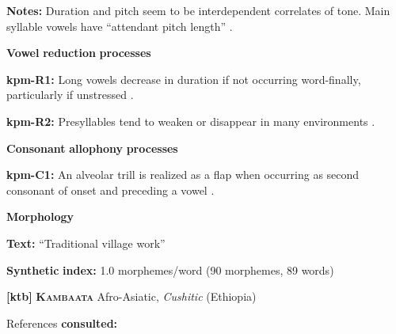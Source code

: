\documentclass[output=paper]{langsci/langscibook}
\begin{document}
\begin{styleBody}
\textbf{Notes:} Duration and pitch seem to be interdependent correlates of tone. Main syllable vowels have “attendant pitch length” \citep[32]{Olsen2014}.
\end{styleBody}

\begin{styleBody}
\textbf{Vowel} \textbf{reduction} \textbf{processes}
\end{styleBody}

\begin{styleBody}
\textbf{kpm-R1:}  Long vowels decrease in duration if not occurring word-finally, particularly if unstressed \citep[33]{Olsen2014}.
\end{styleBody}

\begin{styleBody}
\textbf{kpm-R2:} Presyllables tend to weaken or disappear in many environments \citep[31]{Olsen2014}.
\end{styleBody}

\begin{styleBody}
\textbf{Consonant} \textbf{allophony} \textbf{processes}
\end{styleBody}

\begin{styleBody}
\textbf{kpm-C1:} An alveolar trill is realized as a flap when occurring as second consonant of onset and preceding a vowel \citep[24]{Olsen2014}.
\end{styleBody}

\begin{styleBody}
\textbf{Morphology}
\end{styleBody}

\begin{styleBody}
\textbf{Text:} “Traditional village work” \citep[106-107]{Olsen2014}
\end{styleBody}

\begin{styleBody}
\textbf{Synthetic} \textbf{index:} 1.0 morphemes/word (90 morphemes, 89 words)
\end{styleBody}

\begin{styleBody}
\textbf{[ktb]}   \textbf{\textsc{Kambaata}}  Afro-Asiatic, \textit{Cushitic} (Ethiopia)
\end{styleBody}

\begin{styleBody}
References \textbf{consulted:} \citet{Treis2008}
\end{styleBody}
\end{document}
